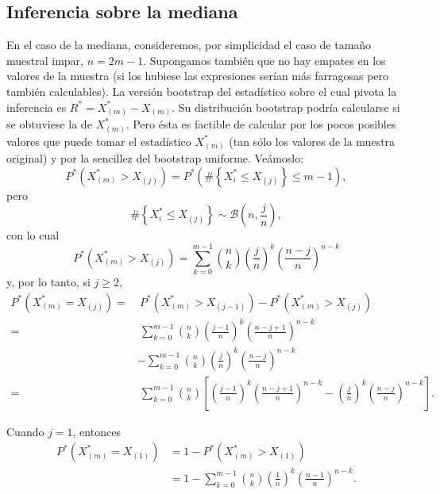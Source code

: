 \documentclass[
]{book}
\theoremstyle{break}
\theoremstyle{definition}
\theoremstyle{definition}
\theoremstyle{definition}
\theoremstyle{remark}
\begin{document}
\hypertarget{inferencia-sobre-la-mediana}{%
\subsection{Inferencia sobre la mediana}\label{inferencia-sobre-la-mediana}}

En el caso de la mediana, consideremos, por simplicidad el caso de
tamaño muestral impar, \(n=2m-1\). Supongamos también que no hay empates
en los valores de la muestra (si los hubiese las expresiones serían más
farragosas pero también calculables). La versión bootstrap del
estadístico sobre el cual pivota la inferencia es \(R^{\ast}=X_{\left( m \right)}^{\ast}-X_{(m)}\). Su distribución bootstrap
podría calcularse si se obtuviese la de \(X_{(m)}^{\ast}\).
Pero ésta es factible de calcular por los pocos posibles valores que
puede tomar el estadístico \(X_{(m)}^{\ast}\) (tan sólo los
valores de la muestra original) y por la sencillez del bootstrap
uniforme.
Veámoslo:
\[P^{\ast}\left( X_{(m)}^{\ast}>X_{(j)} \right)
=P^{\ast}\left( \#\left\{ X_i^{\ast}\leq X_{(j)}\right\}
\leq m-1 \right),\]
pero
\[\#\left\{ X_i^{\ast}\leq X_{(j)}\right\} \sim \mathcal{B}\left(
n,\frac{j}{n} \right),\]
con lo cual
\[P^{\ast}\left( X_{(m)}^{\ast}>X_{(j)} \right)
=\sum_{k=0}^{m-1}\binom{n}{k}\left( \frac{j}{n} \right)^{k}
\left( \frac{n-j}{n} \right)^{n-k}\]
y, por lo tanto, si \(j\geq 2\),
\[\begin{aligned}
P^{\ast}\left( X_{(m)}^{\ast}=X_{(j)} \right)
=&\ P^{\ast}\left( X_{(m)}^{\ast}>X_{\left( j-1 \right)} \right)
-P^{\ast}\left( X_{(m)}^{\ast}>X_{(j)} \right) \\
=&\ \sum_{k=0}^{m-1}\binom{n}{k}\left( \frac{j-1}{n} \right)^{k}\left( \frac{
n-j+1}{n} \right)^{n-k} \\
&-\sum_{k=0}^{m-1}\binom{n}{k}\left( \frac{j}{n} \right)^{k}\left( \frac{n-j}{
n} \right)^{n-k} \\
=&\ \sum_{k=0}^{m-1}\binom{n}{k}\left[ \left( \frac{j-1}{n} \right)^{k}\left( 
\frac{n-j+1}{n} \right)^{n-k}-\left( \frac{j}{n} \right)^{k}\left( \frac{n-j
}{n} \right)^{n-k}\right] .
\end{aligned}\]

Cuando \(j=1\), entonces
\[\begin{aligned}
P^{\ast}\left( X_{(m)}^{\ast} = X_{(1)} \right)
&= 1-P^{\ast}\left( X_{(m)}^{\ast}>X_{(1)} \right) \\
&=  1-\sum_{k=0}^{m-1}\binom{n}{k}\left( \frac{1}{n} \right)^{k}
\left( \frac{n-1}{n} \right)^{n-k}.
\end{aligned}\]
\end{document}
